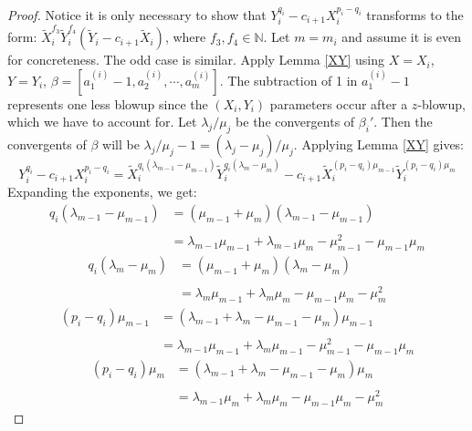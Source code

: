 \documentclass[10pt,a4paper]{amsart}
\begin{document}
\begin{proof}
Notice it is only necessary to show that $Y_{i}^{q_i} - c_{i+1}X_{i}^{p_i-q_i}$ transforms to the form: $\tilde X_{i}^{f_3} \tilde Y_{i}^{f_4} \left(\tilde Y_{i}-c_{i+1} \tilde X_{i}\right)$, where $f_3,f_4\in\mathbb{N}$. Let $m=m_i$ and assume it is even for concreteness. The odd case is similar. Apply Lemma \ref{XY} using $X=X_i$, $Y=Y_i$, $\beta=\left[a_1^{(i)}-1,a_2^{(i)},\cdots,a_{m}^{(i)}\right]$. The subtraction of 1 in $a_1^{(i)}-1$ represents one less blowup since the $(X_i,Y_i)$ parameters occur after a $z$-blowup, which we have to account for. Let $\lambda_j/\mu_j$ be the convergents of $\beta_i'$. Then the convergents of $\beta$ will be $\lambda_j/\mu_j-1=(\lambda_j-\mu_j)/\mu_j$. Applying Lemma \ref{XY} gives:
\begin{equation*}
Y_{i}^{q_i} - c_{i+1}X_{i}^{p_i-q_i} = \tilde X_i^{q_i(\lambda_{m-1}-\mu_{m-1})} \tilde Y_i^{q_i(\lambda_m-\mu_m)} - c_{i+1} \tilde X_i^{(p_i-q_i)\mu_{m-1}} \tilde Y_i^{(p_i-q_i)\mu_m}
\end{equation*}
Expanding the exponents, we get:
\begin{equation*}
\begin{array}{rl}
q_i(\lambda_{m-1}-\mu_{m-1}) & = (\mu_{m-1}+\mu_m)(\lambda_{m-1}-\mu_{m-1})
\\\\
 & =\lambda_{m-1}\mu_{m-1}+\lambda_{m-1}\mu_m-\mu_{m-1}^2-\mu_{m-1}\mu_m
\end{array}
\end{equation*}
\begin{equation*}
\begin{array}{rl}
q_i(\lambda_m-\mu_m) & = (\mu_{m-1}+\mu_m)(\lambda_m-\mu_m)
\\\\
& =\lambda_m\mu_{m-1}+\lambda_m\mu_m-\mu_{m-1}\mu_m-\mu_m^2
\end{array}
\end{equation*}
\begin{equation*}
\begin{array}{rl}
(p_i-q_i)\mu_{m-1} & = (\lambda_{m-1}+\lambda_m-\mu_{m-1}-\mu_m)\mu_{m-1}
\\\\
& =\lambda_{m-1}\mu_{m-1}+\lambda_m\mu_{m-1}-\mu_{m-1}^2-\mu_{m-1}\mu_m
\end{array}
\end{equation*}
\begin{equation*}
\begin{array}{rl}
(p_i-q_i)\mu_m & =(\lambda_{m-1}+\lambda_m-\mu_{m-1}-\mu_m)\mu_m
\\\\
& =\lambda_{m-1}\mu_m+\lambda_m\mu_m-\mu_{m-1}\mu_m-\mu_m^2
\end{array}
\end{equation*}


\end{proof}
\end{document}
